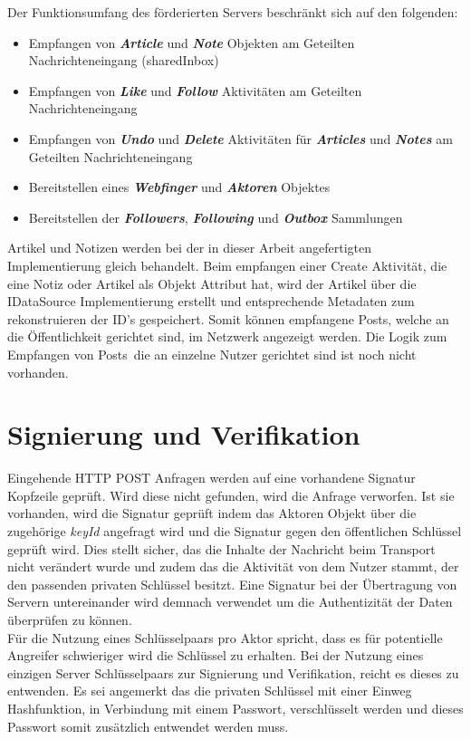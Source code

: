 Der Funktionsumfang des förderierten Servers beschränkt sich auf den folgenden:
\begin{itemize}
	\item Empfangen von \textit{\textbf{Article}} und \textit{\textbf{Note}} Objekten am Geteilten Nachrichteneingang (sharedInbox)
	\item Empfangen von \textit{\textbf{Like}} und \textit{\textbf{Follow}} Aktivitäten am Geteilten Nachrichteneingang
	\item Empfangen von \textit{\textbf{Undo}} und \textit{\textbf{Delete}} Aktivitäten für \textit{\textbf{Articles}} und \textit{\textbf{Notes}} am Geteilten Nachrichteneingang 
	\item Bereitstellen eines \textit{\textbf{Webfinger}} und \textit{\textbf{Aktoren}} Objektes
	\item Bereitstellen der \textit{\textbf{Followers}}, \textit{\textbf{Following}} und \textit{\textbf{Outbox}} Sammlungen
\end{itemize}

Artikel und Notizen werden bei der in dieser Arbeit angefertigten Implementierung gleich behandelt. Beim empfangen einer Create Aktivität, die eine Notiz oder Artikel als Objekt Attribut hat, wird der Artikel über die IDataSource Implementierung erstellt und entsprechende Metadaten zum rekonstruieren der ID's gespeichert. Somit können empfangene \glqq Posts\grqq, welche an die Öffentlichkeit gerichtet sind, im Netzwerk angezeigt werden. Die Logik zum Empfangen von \glqq Posts\grqq~die an einzelne Nutzer gerichtet sind ist noch nicht vorhanden.

\section{Signierung und Verifikation}
Eingehende HTTP POST Anfragen werden auf eine vorhandene Signatur Kopfzeile geprüft. Wird diese nicht gefunden, wird die Anfrage verworfen. Ist sie vorhanden, wird die Signatur geprüft indem das Aktoren Objekt über die zugehörige \textit{keyId} angefragt wird und die Signatur gegen den öffentlichen Schlüssel geprüft wird. Dies stellt sicher, das die Inhalte der Nachricht beim Transport nicht verändert wurde und zudem das die Aktivität von dem Nutzer stammt, der den passenden privaten Schlüssel besitzt. Eine Signatur bei der Übertragung von Servern untereinander wird demnach verwendet um die Authentizität der Daten überprüfen zu können.\\

Für die Nutzung eines Schlüsselpaars pro Aktor spricht, dass es für potentielle Angreifer schwieriger wird die Schlüssel zu erhalten. Bei der Nutzung eines einzigen Server Schlüsselpaars zur Signierung und Verifikation, reicht es dieses zu entwenden. Es sei angemerkt das die privaten Schlüssel mit einer Einweg Hashfunktion, in Verbindung mit einem Passwort, verschlüsselt werden und dieses Passwort somit zusätzlich entwendet werden muss.\\

